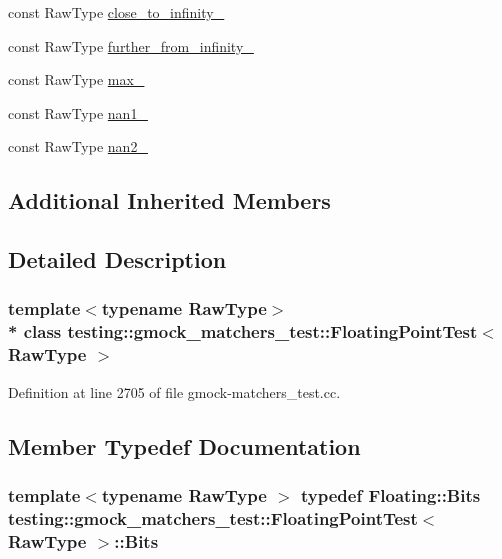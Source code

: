 \begin{DoxyCompactItemize}
const Raw\+Type \hyperlink{classtesting_1_1gmock__matchers__test_1_1_floating_point_test_a6fc8ac2030f4883e1c84da3a21bbb7c3}{close\+\_\+to\+\_\+infinity\+\_\+}
\item 
const Raw\+Type \hyperlink{classtesting_1_1gmock__matchers__test_1_1_floating_point_test_a603ab51280ecb1c4147c2660a7a90728}{further\+\_\+from\+\_\+infinity\+\_\+}
\item 
const Raw\+Type \hyperlink{classtesting_1_1gmock__matchers__test_1_1_floating_point_test_a17b9dd56136b64fa7210bfe024d88c30}{max\+\_\+}
\item 
const Raw\+Type \hyperlink{classtesting_1_1gmock__matchers__test_1_1_floating_point_test_a0d2544956414eac21d4519fe600e4603}{nan1\+\_\+}
\item 
const Raw\+Type \hyperlink{classtesting_1_1gmock__matchers__test_1_1_floating_point_test_a4af3b3e53a06d271479ff30f5d5ee155}{nan2\+\_\+}
\end{DoxyCompactItemize}
\subsection*{Additional Inherited Members}


\subsection{Detailed Description}
\subsubsection*{template$<$typename Raw\+Type$>$\\*
class testing\+::gmock\+\_\+matchers\+\_\+test\+::\+Floating\+Point\+Test$<$ Raw\+Type $>$}



Definition at line 2705 of file gmock-\/matchers\+\_\+test.\+cc.



\subsection{Member Typedef Documentation}
\subsubsection[{\texorpdfstring{Bits}{Bits}}]{\setlength{\rightskip}{0pt plus 5cm}template$<$typename Raw\+Type $>$ typedef {\bf Floating\+::\+Bits} {\bf testing\+::gmock\+\_\+matchers\+\_\+test\+::\+Floating\+Point\+Test}$<$ Raw\+Type $>$\+::{\bf Bits}\hspace{0.3cm}{\ttfamily [protected]}}\hypertarget{classtesting_1_1gmock__matchers__test_1_1_floating_point_test_addf899bd832ae51103198d201d2f2ea2}{}\label{classtesting_1_1gmock__matchers__test_1_1_floating_point_test_addf899bd832ae51103198d201d2f2ea2}


